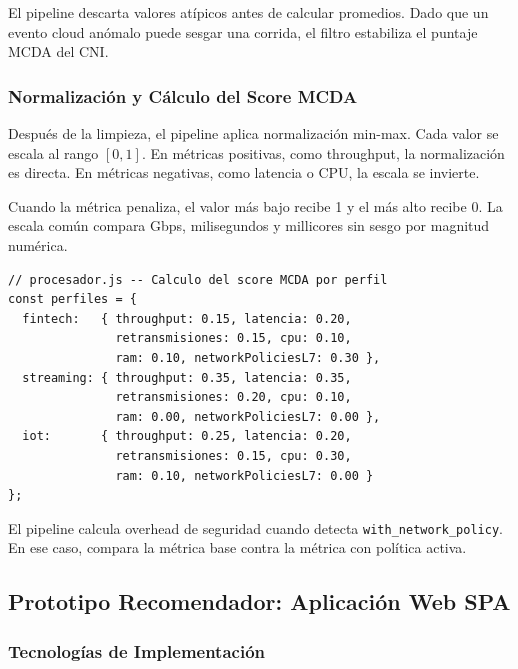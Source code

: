 El pipeline descarta valores atípicos antes de calcular promedios. Dado que un evento cloud anómalo puede sesgar una corrida, el filtro estabiliza el puntaje MCDA del CNI.

\subsubsection{Normalización y Cálculo del Score MCDA}

Después de la limpieza, el pipeline aplica normalización min-max. Cada valor se escala al rango $[0, 1]$. En métricas positivas, como throughput, la normalización es directa. En métricas negativas, como latencia o CPU, la escala se invierte.

Cuando la métrica penaliza, el valor más bajo recibe 1 y el más alto recibe 0. La escala común compara Gbps, milisegundos y millicores sin sesgo por magnitud numérica.

\begin{lstlisting}
// procesador.js -- Calculo del score MCDA por perfil
const perfiles = {
  fintech:   { throughput: 0.15, latencia: 0.20,
               retransmisiones: 0.15, cpu: 0.10,
               ram: 0.10, networkPoliciesL7: 0.30 },
  streaming: { throughput: 0.35, latencia: 0.35,
               retransmisiones: 0.20, cpu: 0.10,
               ram: 0.00, networkPoliciesL7: 0.00 },
  iot:       { throughput: 0.25, latencia: 0.20,
               retransmisiones: 0.15, cpu: 0.30,
               ram: 0.10, networkPoliciesL7: 0.00 }
};
\end{lstlisting}

El pipeline calcula overhead de seguridad cuando detecta \texttt{with\_network\_policy}. En ese caso, compara la métrica base contra la métrica con política activa.

\subsection{Prototipo Recomendador: Aplicación Web SPA}

\subsubsection{Tecnologías de Implementación}

